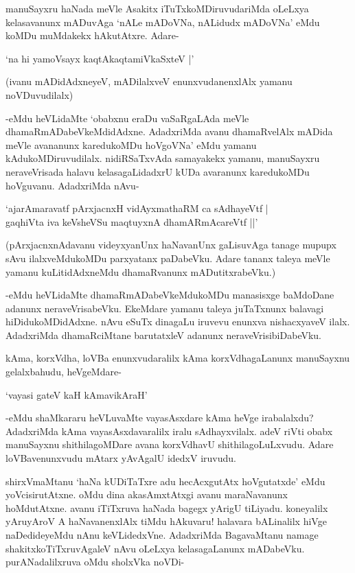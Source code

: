 manuSayxru haNada meVle Asakitx iTuTxkoMDiruvudariMda oLeLxya kelasavanunx mADuvAga `nALe mADoVNa, nALidudx mADoVNa' eMdu koMDu muMdakekx hAkutAtxre. Adare-

\begin{shloka}
`na hi yamoV\s sayx kaqtAkaqtamiVkaSxteV‌ |'
\end{shloka}

(ivanu mADidAdxneyeV, mADilalxveV enunxvudanenxlAlx yamanu noVDuvudilalx)

-eMdu heVLidaMte `obabxnu eraDu vaSaRgaLAda meVle dhamaRmADabeVkeMdidAdxne. AdadxriMda avanu dhamaRvelAlx mADida meVle avananunx karedukoMDu hoVgoVNa' eMdu yamanu kAdukoMDiruvudilalx. nidiRSaTxvAda samayakekx yamanu, manuSayxru neraveVrisada halavu kelasagaLidadxrU kUDa avaranunx karedukoMDu hoVguvanu. AdadxriMda nAvu-

\begin{shloka}
`ajarAmaravatf pArxjacnxH vidAyxmathaRM ca sAdhayeVtf |\\
gaqhiVta iva keVsheVSu maqtuyxnA dhamARmAcareVtf ||'
\end{shloka}

(pArxjacnxnAdavanu videyxyanUnx haNavanUnx gaLisuvAga tanage mupupx sAvu ilalxveMdukoMDu parxyatanx paDabeVku. Adare tananx taleya meVle yamanu kuLitidAdxneMdu dhamaRvanunx mADutitxrabeVku.)

-eMdu heVLidaMte dhamaRmADabeVkeMdukoMDu manasisxge baMdoDane adanunx neraveVrisabeVku. EkeMdare yamanu taleya juTaTxnunx balavagi hiDidukoMDidAdxne. nAvu eSuTx dinagaLu iruvevu enunxva nishacxyaveV ilalx. AdadxriMda dhamaRciMtane barutatxleV adanunx neraveVrisibiDabeVku.

kAma, korxVdha, loVBa enunxvudaralilx kAma korxVdhagaLanunx manuSayxnu gelalxbahudu, heVgeMdare-

\begin{shloka}
`vayasi gateV kaH kAmavikAraH'
\end{shloka}

-eMdu shaMkararu heVLuvaMte vayasAsxdare kAma heVge irabalalxdu? AdadxriMda kAma vayasAsxdavaralilx iralu sAdhayxvilalx. adeV riVti obabx manuSayxnu shithilagoMDare avana korxVdhavU shithilagoLuLxvudu. Adare loVBavenunxvudu mAtarx yAvAgalU idedxV iruvudu.

shirxVmaMtanu `haNa kUDiTaTxre adu hecAcxgutAtx hoVgutatxde' eMdu yoVcisirutAtxne. oMdu dina akasAmxtAtxgi avanu maraNavanunx hoMdutAtxne. avanu iTiTxruva haNada bagegx yArigU tiLiyadu. koneyalilx yAruyAroV A haNavanenxlAlx tiMdu hAkuvaru! halavara bALinalilx hiVge naDedideyeMdu nAnu keVLidedxVne. AdadxriMda BagavaMtanu namage shakitxkoTiTxruvAgaleV nAvu oLeLxya kelasagaLanunx mADabeVku. purANadalilxruva oMdu sholxVka noVDi-

